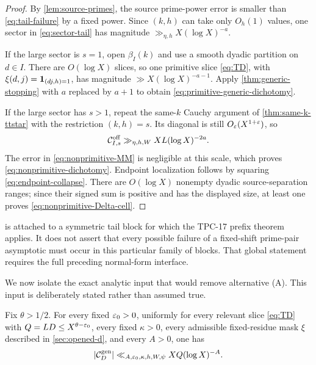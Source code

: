 \begin{proof}
By \cref{lem:source-primes}, the source prime-power error is smaller
than \eqref{eq:tail-failure} by a fixed power.  Since $(k,h)$ can take
only $O_h(1)$ values, one sector in \eqref{eq:sector-tail} has magnitude
$\gg_{\eta,h}X(\log X)^{-a}$.

If the large sector is $s=1$, open $\beta_I(k)$ and use a smooth dyadic
partition on $d\in I$.  There are $O(\log X)$ slices, so one primitive
slice \eqref{eq:TD}, with $\xi(d,j)=\mathbf 1_{(dj,h)=1}$, has magnitude
$\gg X(\log X)^{-a-1}$.  Apply
\cref{thm:generic-stopping} with $a$ replaced by $a+1$ to obtain
\eqref{eq:primitive-generic-dichotomy}.

If the large sector has $s>1$, repeat the same-$k$ Cauchy argument of
\cref{thm:same-k-ttstar} with the restriction $(k,h)=s$.  Its diagonal
is still $O_\varepsilon(X^{1+\varepsilon})$, so
\[
 \mathcal C_{I,s}^{\mathrm{off}}
 \gg_{\eta,h,W}XL(\log X)^{-2a}.
\]
The error in \eqref{eq:nonprimitive-MM} is negligible at this scale,
which proves \eqref{eq:nonprimitive-dichotomy}.  Endpoint localization
follows by squaring \eqref{eq:endpoint-collapse}.  There are
$O(\log X)$ nonempty dyadic source-separation ranges; since their signed
sum is positive and has the displayed size, at least one proves
\eqref{eq:nonprimitive-Delta-cell}.
\end{proof}

\begin{remark}
 is attached to a symmetric tail block
for which the TPC-17 prefix theorem applies.  It does not assert that
every possible failure of a fixed-shift prime-pair asymptotic must occur
in this particular family of blocks.  That global statement requires
the full preceding normal-form interface.
\end{remark}

We now isolate the exact analytic input that would remove alternative
(A).  This input is deliberately stated rather than assumed true.

\begin{assumption}
\label{input:DD}
Fix $\theta>1/2$.  For every fixed $\varepsilon_0>0$, uniformly for every
relevant slice \eqref{eq:TD} with
$Q=LD\le X^{\theta-\varepsilon_0}$, every fixed $\kappa>0$, every admissible
fixed-residue mask $\xi$ described in \cref{sec:opened-d}, and every
$A>0$, one has
\begin{equation}
 |\mathcal C_D^{\mathrm{gen}}|
 \ll_{A,\varepsilon_0,\kappa,h,W,\psi}
 XQ(\log X)^{-A}.
 \label{eq:DD}
\end{equation}
\end{assumption}

